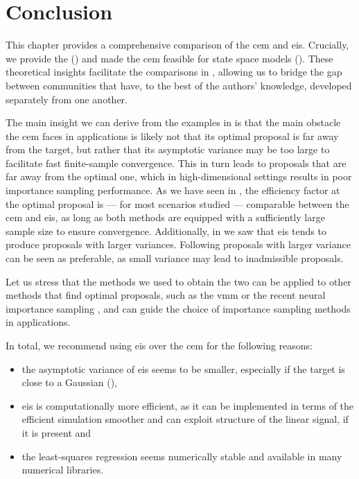 \section{Conclusion}
\label{sec:03_conclusion}

This chapter provides a comprehensive comparison of the \acrshort{cem} and \acrshort{eis}. Crucially, we provide the   () and made the \acrshort{cem} feasible for state space models (). These theoretical insights facilitate the comparisons in , allowing us to bridge the gap between communities that have, to the best of the authors' knowledge, developed separately from one another.

The main insight we can derive from the examples in  is that the main obstacle the \acrshort{cem} faces in applications is likely not that its optimal proposal is far away from the target, but rather that its asymptotic variance may be too large to facilitate fast finite-sample convergence. This in turn leads to proposals that are far away from the optimal one, which in high-dimensional settings results in poor importance sampling performance. As we have seen in , the efficiency factor at the optimal proposal is --- for most scenarios studied --- comparable between the \acrshort{cem} and \acrshort{eis}, as long as both methods are equipped with a sufficiently large sample size to ensure convergence. Additionally, in  we saw that \acrshort{eis} tends to produce proposals with larger variances. Following  proposals with larger variance can be seen as preferable, as small variance may lead to inadmissible proposals.

Let us stress that the methods we used to obtain the two  can be applied to other methods that find optimal proposals, such as the \acrshort{vmm} or the recent neural importance sampling \citep{Muller2019Neural}, and can guide the choice of importance sampling methods in applications.

In total, we recommend using \acrshort{eis} over the \acrshort{cem} for the following reasons:
\begin{itemize}
    \item the asymptotic variance of \acrshort{eis} seems to be smaller, especially if the target is close to a Gaussian (),
    \item \acrshort{eis} is computationally more efficient, as it can be implemented in terms of the efficient simulation smoother and can exploit structure of the linear signal, if it is present and
    \item the least-squares regression seems numerically stable and available in many numerical libraries.
\end{itemize}